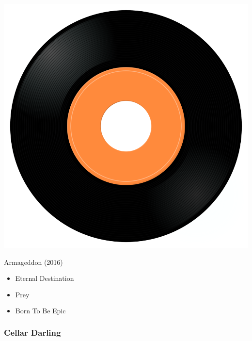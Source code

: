\begin{minipage}[t]{0.25\textwidth}
\captionsetup{type=figure}
\includegraphics[width=\textwidth]{Images/cover.png}
\caption*{Armageddon (2016)}
\end{minipage}
\begin{minipage}[t]{0.25\textwidth}\vspace{0pt}
\begin{itemize}[nosep,leftmargin=1em,labelwidth=*,align=left]
	\setlength{\itemsep}{0pt}
	\item Eternal Destination
	\item Prey
	\item Born To Be Epic
\end{itemize}
\end{minipage}

\subsubsection{Cellar Darling}

